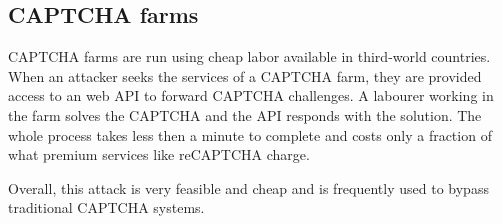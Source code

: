 \subsection{CAPTCHA farms}
CAPTCHA farms are run using cheap labor available in third-world countries. When
an attacker seeks the services of a CAPTCHA farm, they are provided access to an
web API to forward CAPTCHA challenges. A labourer working in the farm solves the
CAPTCHA and the API responds with the solution. The whole process takes less
then a minute to complete and costs only a fraction of what premium services
like reCAPTCHA charge.

Overall, this attack is very feasible and cheap and is frequently used to bypass
traditional CAPTCHA systems.

